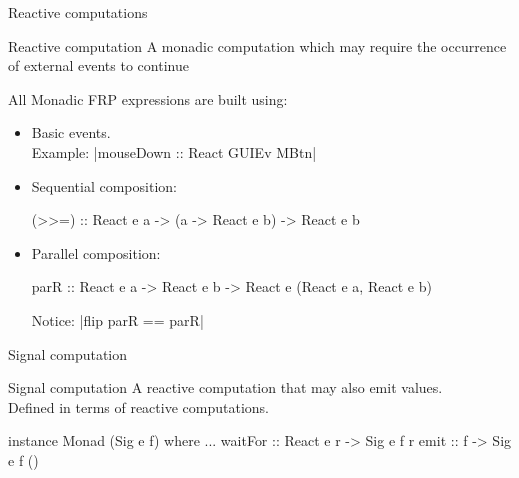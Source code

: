\documentclass{beamer}
\begin{document}
\begin{frame}{Reactive computations}

\begin{block}{Reactive computation}
A monadic computation which may require the occurrence of external events to continue
\end{block}

All Monadic FRP expressions are built using:
  \begin{itemize}
    \item Basic events.  \\
\vspace{0.3cm}
  Example: |mouseDown :: React GUIEv MBtn|
\vspace{0.3cm}
    \item Sequential composition:\\ 
 \begin{code}
    (>>=) :: React e a -> (a -> React e b) -> React e b
  \end{code}
\item Parallel composition:  \\
 \begin{code}
 parR :: React e a -> React e b -> React e (React e a, React e b)
\end{code}
Notice: |flip parR == parR|
\end{itemize}

\end{frame}



\begin{frame}{Signal computation}
\begin{block}{Signal computation}
A reactive computation that may also \alert{emit} values.\\
 Defined in terms of reactive computations.
\end{block}
\begin{code}
instance Monad (Sig e f) where ...
waitFor   :: React e r -> Sig e f r
emit      :: f -> Sig e f ()
\end{code}

\end{frame}
\end{document}

